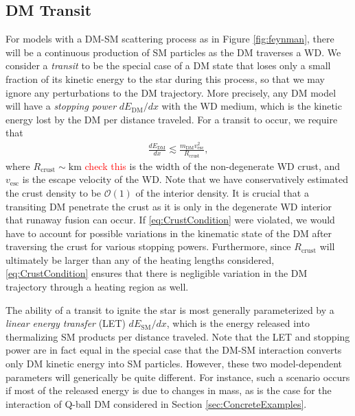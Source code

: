 \documentclass[twocolumn,showpacs,preprintnumbers,amsmath,amssymb,prd]{revtex4}
\newcommand{\OO}{\mathcal{O}}
\begin{document}
\subsection{DM Transit}
\label{sec:transit}
For models with a DM-SM scattering process as in Figure \ref{fig:feynman}, there will be a continuous production of SM particles as the DM traverses a WD.  We consider a \emph{transit} to be the special case of a DM state that loses only a small fraction of its kinetic energy to the star during this process, so that we may ignore any perturbations to the DM trajectory. More precisely, any DM model will have a \emph{stopping power} $d E_\text{DM}/d x$ with the WD medium, which is the kinetic energy lost by the DM per distance traveled.  For a transit to occur, we require that
\begin{align}
\frac{d E_\text{DM}}{d x} \lesssim \frac{m_\text{DM} v^2_\text{esc}}{R_\text{crust}},
\label{eq:CrustCondition}
\end{align}
where $R_\text{crust} \sim \text{km}$ \textcolor{red}{check this} is the width of the non-degenerate WD crust, and $v_\text{esc}$ is the escape velocity of the WD. Note that we have conservatively estimated the crust density to be $\OO(1)$ of the interior density. It is crucial that a transiting DM penetrate the crust as it is only in the degenerate WD interior that runaway fusion can occur.  If \eqref{eq:CrustCondition} were violated, we would have to account for possible variations in the kinematic state of the DM after traversing the crust for various stopping powers. Furthermore, since $R_\text{crust}$ will ultimately be larger than any of the heating lengths considered, \eqref{eq:CrustCondition} ensures that there is negligible variation in the DM trajectory through a heating region as well. 

The ability of a transit to ignite the star is most generally parameterized by a \emph{linear energy transfer} (LET) $d E_\text{SM}/d x$, which is the energy released into thermalizing SM products per distance traveled. Note that the LET and stopping power are in fact equal in the special case that the DM-SM interaction converts only DM kinetic energy into SM particles. However, these two model-dependent parameters will generically be quite different. For instance, such a scenario occurs if most of the released energy is due to changes in mass, as is the case for the interaction of Q-ball DM considered in Section \ref{sec:ConcreteExamples}. 
\end{document}
